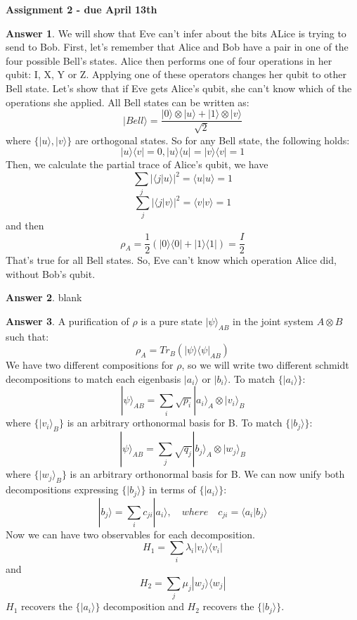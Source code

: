 \documentclass[12pt]{article}
\newcommand{\ket}[1]{|#1\rangle}
\newcommand{\bra}[1]{\langle#1|}
\newcommand{\ketbra}[2]{| #1 \rangle \langle #2 |}
\newcommand{\braket}[2]{\langle  #1 |#2 \rangle}
\theoremstyle{plain}
\theoremstyle{definition}
\newtheorem{ans}{Answer}
\begin{document}
\begin{center}
\Large \textbf{{Assignment 2 - due April 13th}}
\end{center} 

\noindent \hrulefill

\begin{ans}
	We will show that Eve can't infer about the bits ALice is trying to send to Bob.
    First, let's remember that Alice and Bob have a pair in one of the four possible
    Bell's states. Alice then performs one of four operations in her qubit: I, X, Y or Z.
    Applying one of these operators changes her qubit to other Bell state. Let's show
    that if Eve gets Alice's qubit, she can't know which of the operations she applied.
    All Bell states can be written as:
    \[ \ket{Bell} = \frac{\ket{0}\otimes\ket{u} + \ket{1}\otimes\ket{v}}{\sqrt{2} }\]
    where $\{ \ket{u}, \ket{v}\}$ are orthogonal states.
    So for any Bell state, the following holds: 
    \[\ketbra{u}{v} = 0, \ketbra{u}{u} = \ketbra{v}{v} = 1\]
    Then, we calculate the partial trace of Alice's qubit, we have
    \[ \sum_{j}\left\lvert \braket{j}{u}\right\rvert^2 = \braket{u}{u} = 1\]
    \[ \sum_{j}\left\lvert \braket{j}{v}\right\rvert^2 = \braket{v}{v} = 1\]
    and then 
    \[\rho_A = \frac{1}{2}(\ket{0}\bra{0} + \ket{1}\bra{1}) = \frac{I}{2}\]
    That's true for all Bell states.
    So, Eve can't know which operation Alice did, without Bob's qubit.
\end{ans}

\noindent \hrulefill

\begin{ans}
	blank
\end{ans}

\noindent \hrulefill

\begin{ans}
	A purification of $\rho$ is a pure state $\ket{\psi}_{AB}$ in the joint system
    $A \otimes B$ such that:
    \[\rho_A = Tr_B(\ket{\psi}\bra{\psi}_{AB})\]
    We have two different compositions for $\rho$, so we will write two different
    schmidt decompositions to match each eigenbasis $\ket{a_i}$ or $\ket{b_i}$.
    To match $\{\ket{a_i}\}$: 
    \[ \ket{\psi}_{AB} = \sum_{i}\sqrt{p_i}\ket{a_i}_A\otimes\ket{v_i}_B\]
    where $\{\ket{v_i}_B\}$  is an arbitrary orthonormal basis for B.
    To match $\{\ket{b_j}\}$: 
    \[ \ket{\psi}_{AB} = \sum_{j}\sqrt{q_j}\ket{b_j}_A\otimes\ket{w_j}_B\]
    where $\{\ket{w_j}_B\}$  is an arbitrary orthonormal basis for B.
    We can now unify both decompositions expressing $\{\ket{b_j}\}$ in terms of $\{\ket{a_i}\}$:
    \[\ket{b_j} = \sum_i c_{ji}\ket{a_i}, \quad where \quad c_{ji} = \braket{a_i}{b_j}\]
    Now we can have two observables for each decomposition.
    \[H_1 = \sum_i \lambda_i \ket{v_i}\bra{v_i}\]
    and
    \[H_2 = \sum_j \mu_j \ket{w_j}\bra{w_j}\]
    $H_1$ recovers the $\{\ket{a_i}\}$ decomposition and $H_2$ recovers the $\{\ket{b_j}\}$.
\end{ans}
\end{document}
